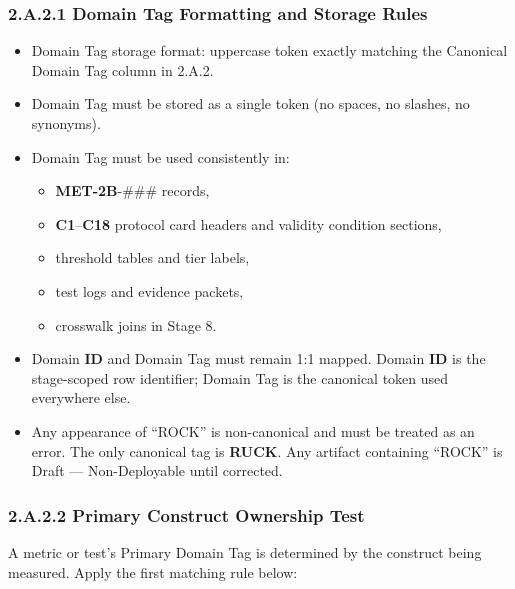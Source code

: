 \documentclass[10pt]{article}
\begin{document}
\subsubsection*{2.A.2.1 Domain Tag Formatting and Storage Rules}

\begin{itemize}
\item Domain Tag storage format: uppercase token exactly matching the Canonical Domain Tag column in 2.A.2.
\item Domain Tag must be stored as a single token (no spaces, no slashes, no synonyms).
\item Domain Tag must be used consistently in:
  \begin{itemize}
  \item \textbf{MET-2B}-\#\#\# records,
  \item \textbf{C1}–\textbf{C18} protocol card headers and validity condition sections,
  \item threshold tables and tier labels,
  \item test logs and evidence packets,
  \item crosswalk joins in Stage 8.
  \end{itemize}
\item Domain \textbf{ID} and Domain Tag must remain 1:1 mapped. Domain \textbf{ID} is the stage-scoped row identifier; Domain Tag is the canonical token used everywhere else.
\item Any appearance of “ROCK” is non-canonical and must be treated as an error. The only canonical tag is \textbf{RUCK}. Any artifact containing “ROCK” is Draft — Non-Deployable until corrected.
\end{itemize}

\subsubsection*{2.A.2.2 Primary Construct Ownership Test}

A metric or test’s Primary Domain Tag is determined by the construct being measured. Apply the first matching rule below:
\end{document}
